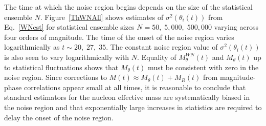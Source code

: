 The time at which  the noise region begins depends on the size of the statistical ensemble $N$. 
Figure~\ref{ThWNAll} shows estimates of $\sigma^2(\theta_i(t))$ from Eq.~\eqref{WNest} for statistical ensemble sizes $N=50,\;5,000,\;500,000$ varying across four orders of magnitude. 
The time of the onset of the noise region  varies logarithmically as $t \sim 20,\;27,\;35$. 
The constant noise region value of $\sigma^2(\theta_i(t))$ is also seen to vary logarithmically with $N$. 
Equality of $M_\theta^{WN}(t)$ and $M_\theta(t)$ up to statistical fluctuations shows that $M_\theta(t)$ must be 
consistent with zero in the noise region. 
Since corrections to $M(t) \approx M_\theta(t) + M_R(t)$ from magnitude-phase correlations appear small at all times, 
it is reasonable to conclude that standard estimators for the nucleon effective mass are systematically biased in the noise 
region and that exponentially large increases in statistics are required to delay the onset of the noise region.





